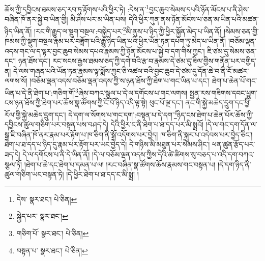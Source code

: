 ཆོས་ཀྱི་དབྱིངས་ཐམས་ཅད་རབ་ཏུ་རྟོགས་པའི་ཕྱིར་ཏེ། :དེས་ན་\footnote{དེས་  སྣར་ཐང་།  པེ་ཅིན། }བྱང་ཆུབ་སེམས་དཔའི་ཉོན་མོངས་པ་ནི་ཤེས་བཞིན་ཁོ་ནར་སྐྱེ་བ་ཡིན་གྱི། མི་ཤེས་པར་མ་ཡིན་པས། དེའི་ཕྱིར་ཀུན་ནས་ཉོན་མོངས་པ་ཅན་མ་ཡིན་པའི་མཚན་ཉིད་ཡིན་ནོ། །རང་གི་རྒྱུད་ལ་སྡུག་བསྔལ་:བསྐྱེད་པར་\footnote{སྐྱེད་པར་  སྣར་ཐང་། }མི་ནུས་པ་ཉིད་ཀྱི་ཕྱིར་སྐྱོན་མེད་པ་ཡིན་ནོ། །སེམས་ཅན་གྱི་ཁམས་ཀྱི་སྡུག་བསྔལ་རྣམ་པར་བཟློག་པའི་རྒྱུ་ཉིད་ཡིན་པའི་ཕྱིར་ཡོན་ཏན་དཔག་ཏུ་མེད་པ་ཡིན་ནོ། །བཅོམ་ལྡན་འདས་གང་ལ་ད་ལྟར་བྱང་ཆུབ་སེམས་དཔའ་རྣམས་ཀྱི་ཉོན་མོངས་པ་སྐྱེ་བ་དག་གིས་ཀྱང་། ཇི་ཙམ་དུ་སེམས་ཅན་དང་། ཉན་ཐོས་དང་། རང་སངས་རྒྱས་ཐམས་ཅད་ཀྱི་དགེ་བའི་རྩ་བ་རྣམས་དེ་ཙམ་དུ་ཟིལ་གྱིས་གནོན་པར་བགྱིད་ན། དེ་ལས་གཞན་པའི་ཡོན་ཏན་རྣམས་ལྟ་སྨོས་ཀྱང་ཅི་འཚལ་བའི་བྱང་ཆུབ་དེ་ཙམ་དུ་དོན་ཆེ་བ་ནི་ངོ་མཚར་ལགས་སོ། །བཅོམ་ལྡན་འདས་བཅོམ་ལྡན་འདས་ཀྱི་ས་ཉན་ཐོས་ཀྱི་ཐེག་པ་གང་ཡིན་པ་དང་། ཐེག་པ་ཆེན་པོ་གང་ཡིན་པ་དེ་ནི་ཐེག་པ་:གཅིག་གོ་\footnote{གཅིག་པོ་  སྣར་ཐང་།  པེ་ཅིན། }ཞེས་བཀའ་སྩལ་པ་དེ་ལ་དགོངས་པ་གང་ལགས། སྤྱན་རས་གཟིགས་དབང་ཕྱུག་ངས་ཉན་ཐོས་ཀྱི་ཐེག་པར་ཆོས་སྣ་ཚོགས་ཀྱི་ངོ་བོ་ཉིད་འདི་ལྟ་སྟེ། ཕུང་པོ་ལྔ་དང་། ནང་གི་སྐྱེ་མཆེད་དྲུག་དང་ཕྱི་རོལ་གྱི་སྐྱེ་མཆེད་དྲུག་དང་། དེ་དག་ལ་སོགས་པ་གང་དག་:བསྟན་པ་དེ་དག་\footnote{བསྟན་པ་  སྣར་ཐང་།  པེ་ཅིན། }ཉིད་ངས་ཐེག་པ་ཆེན་པོར་ཆོས་ཀྱི་དབྱིངས་ཚུལ་གཅིག་པར་བསྟན་པས་བཤད་དེ། དེའི་ཕྱིར་ང་ནི་ཐེག་པ་ཐ་དད་པར་མི་སྨྲའོ། །དེ་ལ་གང་དག་དོན་ལ་སྒྲ་ཇི་བཞིན་ཁོ་ནར་རྣམ་པར་རྟོག་པ་ཁ་ཅིག་ནི་སྒྲོ་འདོགས་པར་བྱེད། ཁ་ཅིག་ནི་སྐུར་པ་འདེབས་པར་བྱེད་ཅིང་། ཐེག་པ་ཐ་དད་པ་ཉིད་དུ་རྣམ་པར་རྟོག་པར་ཡང་བྱེད་དེ། དེ་གཉིས་མི་མཐུན་པར་སེམས་ཤིང་། ཕན་ཚུན་རྩོད་པར་ཟད་དེ། དེ་ལ་དགོངས་པ་ནི་དེ་ཡིན་ནོ། །དེ་ལ་བཅོམ་ལྡན་འདས་ཀྱིས་དེའི་ཚེ་ཚིགས་སུ་བཅད་པ་འདི་དག་བཀའ་སྩལ་ཏོ། །ཐེག་པ་ཆེ་དང་ཐེག་པ་དམན་པ་ལ། །རང་བཞིན་སྣ་ཚོགས་ཆོས་རྣམས་གང་བསྟན་པ། །དེ་དག་ཉིད་ནི་ཚུལ་གཅིག་ཡང་བསྟན་ཏེ། །དེ་ཕྱིར་ཐེག་པ་ཐ་དད་ང་མི་སྨྲ། །
